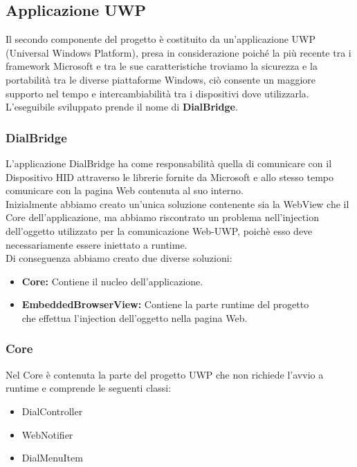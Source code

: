 \subsection{Applicazione UWP}

Il secondo componente del progetto è costituito da un'applicazione UWP (Universal Windows Platform)\cite{uwpdoc}, presa in considerazione poiché la più recente tra i framework Microsoft e tra le sue caratteristiche troviamo la sicurezza e la portabilità tra le diverse piattaforme Windows, ciò consente un maggiore supporto nel tempo e intercambiabilità tra i dispositivi dove utilizzarla. L'eseguibile sviluppato prende il nome di \textbf{DialBridge}.\\

\subsubsection{DialBridge}

L’applicazione DialBridge ha come responsabilità quella di comunicare con il Dispositivo HID attraverso le librerie fornite da Microsoft e allo stesso tempo comunicare con la pagina Web contenuta al suo interno.\\

Inizialmente abbiamo creato un'unica soluzione contenente sia la WebView che il Core dell'applicazione, ma abbiamo riscontrato un problema nell’injection dell'oggetto utilizzato per la comunicazione Web-UWP, poichè esso deve necessariamente essere iniettato a runtime.\\

Di conseguenza abbiamo creato due diverse soluzioni:

\begin{itemize}
\item \textbf{Core:} Contiene il nucleo dell’applicazione.
\item \textbf{EmbeddedBrowserView:} Contiene la parte runtime del progetto\\ che 			effettua l’injection dell’oggetto nella pagina Web.
\end{itemize}

\subsubsection{Core}

Nel Core è contenuta la parte del progetto UWP che non richiede l'avvio a runtime e comprende le seguenti classi:

\begin{itemize}
\item DialController
\item WebNotifier
\item DialMenuItem
\end{itemize}

